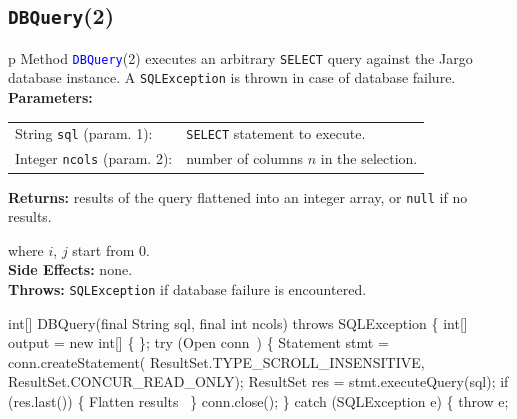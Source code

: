 \subsection{\texttt{DBQuery}(2)}
\begin{tabular}{p{\textwidth}}
\toprule
{}
Method \textcolor{blue}{{\tt{}\protect{}DBQuery}}(2) executes an arbitrary {\tt{}SELECT}
query against the Jargo database instance.
A {\tt{}SQLException} is thrown in case of database failure.\\
\midrule
\textbf{Parameters:} \\
\begin{tabular}{lp{116mm}}
String {\tt{}sql} (param. 1):&{\tt{}SELECT} statement to execute.\\
Integer {\tt{}ncols} (param. 2):&number of columns $n$ in the selection.\\
\end{tabular}
\textbf{Returns:} results of the query flattened into an integer array,
or {\tt{}null} if no results.


where $i$, $j$ start from 0.\\
\textbf{Side Effects:} none.\\
\textbf{Throws:} {\tt{}SQLException} if database failure is encountered.\\
\bottomrule
\end{tabular}
\nwenddocs{}\endmoddef{}
int[] DBQuery(final String sql, final int ncols) throws SQLException \{
  int[] output = new int[] \{ \};
  try (\LA{}Open \code{}conn\edoc{}~{\nwtagstyle{}}\RA{}) \{
    Statement stmt = conn.createStatement(
      ResultSet.TYPE_SCROLL_INSENSITIVE, ResultSet.CONCUR_READ_ONLY);
    ResultSet res = stmt.executeQuery(sql);
    if (res.last()) \{
      \LA{}Flatten results~{\nwtagstyle{}}\RA{}
    \}
    conn.close();
  \} catch (SQLException e) \{
    throw e;
